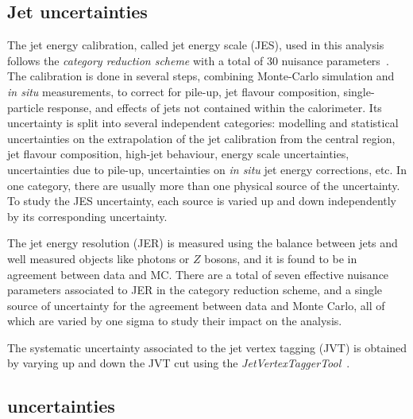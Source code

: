 \subsection*{Jet uncertainties}

The jet energy calibration, called jet energy scale (JES), used in this analysis follows the \emph{category reduction scheme} with a total of 30 nuisance parameters~\cite{PERF-2016-04, PERF-2012-01}. The calibration is done in several steps, combining Monte-Carlo simulation and \textit{in situ} measurements, to correct for pile-up, jet flavour composition, single-particle response, and effects of jets not contained within the calorimeter. Its uncertainty is split into several independent categories: modelling and statistical uncertainties on the extrapolation of the jet calibration from the central region, jet flavour composition, high-\pT jet behaviour, \bjet energy scale uncertainties, uncertainties due to pile-up, uncertainties on \textit{in situ} jet energy corrections, etc. In one category, there are usually more than one physical source of the uncertainty. To study the JES uncertainty, each source is varied up and down independently by its corresponding uncertainty. 

The jet energy resolution (JER) is measured using the balance between jets and well measured objects like photons or $Z$ bosons, and it is found to be in agreement between data and MC. There are a total of seven effective nuisance parameters associated to JER in the category reduction scheme, and a single source of uncertainty for the agreement between data and Monte Carlo, all of which are varied by one sigma to study their impact on the analysis.

The systematic uncertainty associated to the jet vertex tagging (JVT) is obtained by varying up and down the JVT cut using the \emph{JetVertexTaggerTool}~\cite{ATLAS-CONF-2014-018}. 


\subsection*{\btag uncertainties}

